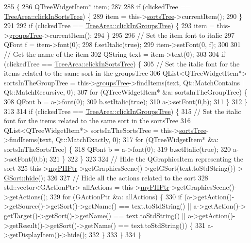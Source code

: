 \begin{DoxyCode}
285                                        \{
286     QTreeWidgetItem* item;
287 
288     \textcolor{keywordflow}{if} (clickedTree == \hyperlink{classTreeArea_a580e62f552dbda007c636bc69cc5e0a7}{TreeArea::clickInSortsTree}) \{
289         item = this->\hyperlink{classTreeArea_ad323879d9e2e64b18dae18fe757b1b0e}{sortsTree}->currentItem();
290     \}
291 
292     \textcolor{keywordflow}{if} (clickedTree == \hyperlink{classTreeArea_a6c8a68ece69178b1c902cf8ee8652756}{TreeArea::clickInGroupsTree}) \{
293         item = this->\hyperlink{classTreeArea_ab3cf8ca35655b0bace24a7c46170852f}{groupsTree}->currentItem();
294     \}
295 
296     \textcolor{comment}{// Set the item font to italic}
297     QFont f = item->font(0);
298     f.setItalic(\textcolor{keyword}{true});
299     item->setFont(0, f);
300 
301     \textcolor{comment}{// Get the name of the item}
302     QString text = item->text(0);
303 
304     \textcolor{keywordflow}{if} (clickedTree == \hyperlink{classTreeArea_a580e62f552dbda007c636bc69cc5e0a7}{TreeArea::clickInSortsTree}) \{
305         \textcolor{comment}{// Set the italic font for the items related to the same sort in the groupsTree}
306         QList<QTreeWidgetItem*> sortsInTheGroupTree = this->\hyperlink{classTreeArea_ab3cf8ca35655b0bace24a7c46170852f}{groupsTree}->findItems(text, 
      Qt::MatchContains | Qt::MatchRecursive, 0);
307         \textcolor{keywordflow}{for} (QTreeWidgetItem* &a: sortsInTheGroupTree) \{
308             QFont b = a->font(0);
309             b.setItalic(\textcolor{keyword}{true});
310             a->setFont(0,b);
311         \}
312     \}
313 
314     \textcolor{keywordflow}{if} (clickedTree == \hyperlink{classTreeArea_a6c8a68ece69178b1c902cf8ee8652756}{TreeArea::clickInGroupsTree}) \{
315         \textcolor{comment}{// Set the italic font for the items related to the same sort in the sortsTree}
316         QList<QTreeWidgetItem*> sortsInTheSortsTree = this->\hyperlink{classTreeArea_ad323879d9e2e64b18dae18fe757b1b0e}{sortsTree}->findItems(text, 
      Qt::MatchExactly, 0);
317         \textcolor{keywordflow}{for} (QTreeWidgetItem* &a: sortsInTheSortsTree) \{
318             QFont b = a->font(0);
319             b.setItalic(\textcolor{keyword}{true});
320             a->setFont(0,b);
321         \}
322     \}
323 
324     \textcolor{comment}{// Hide the QGraphicsItem representing the sort}
325     this->\hyperlink{classTreeArea_a290d659da16085f21c04f81fcd16891c}{myPHPtr}->getGraphicsScene()->getGSort(text.toStdString())->
      \hyperlink{classGSort_acafeaec8637b62aea47c2ecb4c36e0be}{GSort::hide}();
326 
327     \textcolor{comment}{// Hide all the actions related to the sort}
328     std::vector<GActionPtr> allActions = this->\hyperlink{classTreeArea_a290d659da16085f21c04f81fcd16891c}{myPHPtr}->getGraphicsScene()->getActions();
329     \textcolor{keywordflow}{for} (GActionPtr &a: allActions) \{
330         \textcolor{keywordflow}{if} (a->getAction()->getSource()->getSort()->getName() == text.toStdString() || a->getAction()->
      getTarget()->getSort()->getName() == text.toStdString() || a->getAction()->getResult()->getSort()->getName() == 
      text.toStdString()) \{
331             a->getDisplayItem()->hide();
332         \}
333     \}
334 \}
\end{DoxyCode}
